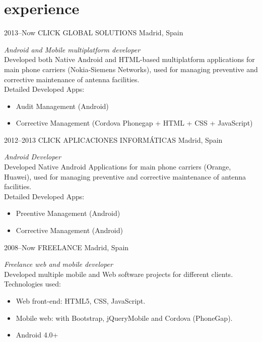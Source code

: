\documentclass[]{friggeri-cv} %
\begin{document}

\section{experience}

\begin{entrylist}

\entry
{2013--Now}
{CLICK GLOBAL SOLUTIONS}
{Madrid, Spain}
{\emph{Android and Mobile multiplatform developer} \\
Developed both Native Android and HTML-based multiplatform applications for main phone carriers (Nokia-Siemens Networks), used for managing preventive and corrective maintenance of antenna facilities. \\
Detailed Developed Apps:

\begin{itemize}
\item Audit Management (Android)
\item Corrective Management (Cordova Phonegap + HTML + CSS + JavaScript)
\end{itemize}}


\entry
{2012--2013}
{CLICK APLICACIONES INFORMÁTICAS}
{Madrid, Spain}
{\emph{Android Developer} \\
Developed Native Android Applications for main phone carriers (Orange, Huawei), used for managing preventive and corrective maintenance of antenna facilities. \\
Detailed Developed Apps:

\begin{itemize}
\item Preentive Management (Android)
\item Corrective Management (Android)
\end{itemize}}

\entry
{2008--Now}
{FREELANCE}
{Madrid, Spain}
{\emph{Freelance web and mobile developer} \\
Developed multiple mobile and Web software projects for different clients.
Technologies used:

\begin{itemize}
\item Web front-end: HTML5, CSS, JavaScript.
\item Mobile web: with Bootstrap, jQueryMobile and Cordova (PhoneGap).
\item Android 4.0+
\end{itemize}}

\end{entrylist}
\end{document}
